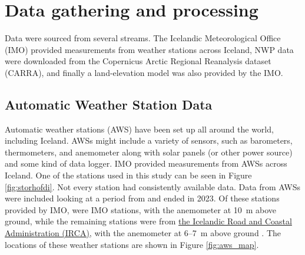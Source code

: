 
\chapter{Data gathering and processing}
\label{Chapter2}
Data were sourced from several streams. The Icelandic Meteorological Office (IMO) provided measurements from weather stations across Iceland, NWP data were downloaded from the Copernicus Arctic Regional Reanalysis dataset (CARRA), and finally a land-elevation model was also provided by the IMO.

\section{Automatic Weather Station Data}

Automatic weather stations (AWS) have been set up all around the world, including Iceland. AWSs might include a variety of sensors, such as barometers, thermometers, and anemometer along with solar panels (or other power source) and some kind of data logger. IMO provided measurements from AWSs across Iceland. One of the stations used in this study can be seen in Figure \ref{fig:storhofdi}. Not every station had consistently available data. Data from \nStationsMin AWSs were included looking at a period from \startDateVedur and ended in 2023. Of these \nStationsMin stations provided by IMO, \nVedurMin were IMO stations, with the anemometer at 10~m above ground, while the remaining \nVGMin stations were from \href{https://www.vegagerdin.is/}{the Icelandic Road and Coastal Administration (IRCA)}, with the anemometer at 6–7~m above ground \cite{vegagerdin_postur}. The locations of these weather stations are shown in Figure \ref{fig:aws_map}.

